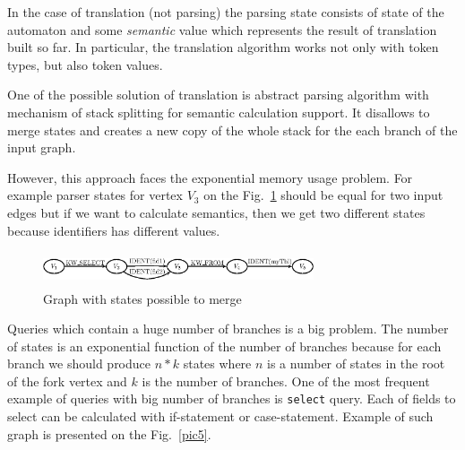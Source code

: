 In the case of translation (not parsing) the parsing state consists of state of the automaton and some
\emph{semantic} value which represents the result of translation built so far. In particular,
the translation algorithm works not only with token types, but also token values. 

%


One of the possible solution of translation is abstract parsing algorithm with mechanism of stack 
splitting for semantic calculation support. It disallows to merge states and creates a new 
copy of the whole stack for the each branch of the input graph.

However, this approach faces the exponential memory usage problem. 
For example parser states for vertex $V_3$ on the Fig.~\ref{pic4} should be equal for two input edges
but if we want to calculate semantics, then we get two different states because identifiers has 
different values.

\begin{figure}
    \begin{center}
        \includegraphics[width=8cm,height=1.0cm]{graphs/states_example.eps}
        \caption{Graph with states possible to merge}
        \label{pic4}
    \end{center}
\end{figure}

Queries which contain a huge number of branches is a big problem. The number of states is an 
exponential function of the number of branches because for each branch we should produce $n*k$ 
states where $n$ is a number of states in the root of the fork vertex and $k$ is the number 
of branches. One of the most frequent example of queries with big number of branches 
is \verb|select| query. Each of fields to select can be calculated with if-statement 
or case-statement. Example of such graph is presented on the Fig.~\ref{pic5}.

